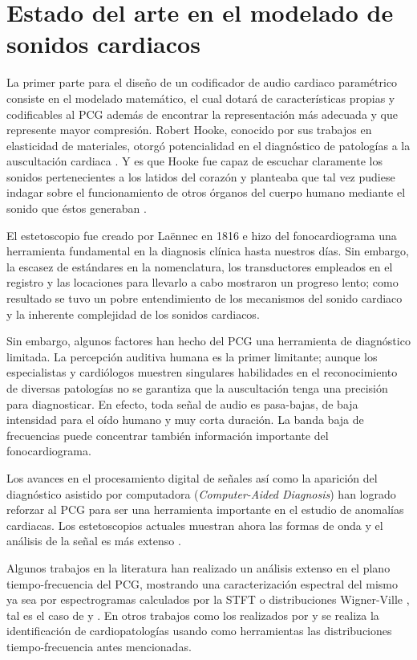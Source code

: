 \section{Estado del arte en el modelado de sonidos cardiacos}
La primer parte para el diseño de un codificador de audio cardiaco paramétrico consiste en el modelado matemático, el cual dotará de características propias y codificables al PCG además de encontrar la representación más adecuada y que represente mayor compresión. 
Robert Hooke, conocido por sus trabajos en elasticidad de materiales, otorgó potencialidad en el diagnóstico de patologías a la auscultación cardiaca \cite[]{Wood1995}. Y es que Hooke fue capaz de escuchar claramente los sonidos pertenecientes a los latidos del corazón y planteaba que tal vez pudiese indagar sobre el funcionamiento de otros órganos del cuerpo humano mediante el sonido que éstos generaban \cite[]{Leatham1987}.

El estetoscopio fue creado por Laënnec en 1816 \cite[]{Roguin2006} e hizo del fonocardiograma una herramienta fundamental en la diagnosis clínica hasta nuestros días. Sin embargo, la escasez de estándares en la nomenclatura, los transductores empleados en el registro y las locaciones para llevarlo a cabo mostraron un progreso lento; como resultado se tuvo un pobre entendimiento de los mecanismos del sonido cardiaco y la inherente complejidad de los sonidos cardiacos. 

Sin embargo, algunos factores han hecho del PCG una herramienta de diagnóstico limitada. La percepción auditiva humana es la primer limitante; aunque los especialistas y cardiólogos muestren singulares habilidades en el reconocimiento de diversas patologías no se garantiza que la auscultación tenga una precisión para diagnosticar. En efecto, toda señal de audio es pasa-bajas, de baja intensidad para el oído humano y muy corta duración. La banda baja de frecuencias puede concentrar también información importante del fonocardiograma.
 
 Los avances en el procesamiento digital de señales así como la aparición del diagnóstico asistido por computadora (\emph{Computer-Aided Diagnosis}) han logrado reforzar al PCG para ser una herramienta importante en el estudio de anomalías cardiacas. Los estetoscopios actuales muestran ahora las formas de onda y el análisis de la señal es más extenso \cite[]{Mahnke2009,Watrous2008}.
 
 Algunos trabajos en la literatura han realizado un análisis extenso en el plano tiempo-frecuencia del PCG, mostrando una caracterización espectral del mismo ya sea por espectrogramas calculados por la STFT o distribuciones Wigner-Ville \cite[]{Ghofrani1993}, tal es el caso de \cite{Djebbari2000,Debbal2007,Debbal2008} y \cite{Jasper2010}. En otros trabajos como los realizados por \cite{Boutana2011} y \cite{DEBBAL2006} se realiza la identificación de cardiopatologías usando como herramientas las distribuciones tiempo-frecuencia antes mencionadas.
 
